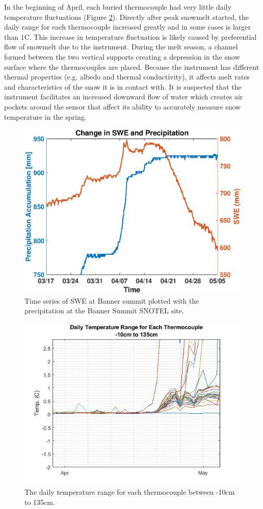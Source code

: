 In the beginning of April, each buried thermocouple had very little daily temperature fluctuations (Figure \ref{fig:DailyTempRange}). Directly after peak snowmelt started, the daily range for each thermocouple increased greatly and in some cases is larger than 1\textdegree C. This increase in temperature fluctuation is likely caused by preferential flow of snowmelt due to the instrument. During the melt season, a channel formed between the two vertical supports creating a depression in the snow surface where the thermocouples are placed. Because the instrument has different thermal properties (e.g. albedo and thermal conductivity), it affects melt rates and characteristics of the snow it is in contact with. It is suspected that the instrument facilitates an increased downward flow of water which creates air pockets around the sensor that affect its ability to accurately measure snow temperature in the spring. 

\begin{figure}[H]
    \centering
    \includegraphics[width=0.7\linewidth]{figures/TCArray/SWE_Precip_LateSeason.eps}
    \caption{Time series of SWE at Banner summit plotted with the precipitation at the Banner Summit SNOTEL site.}
    \label{fig:SWE_SNTLPrecip}
\end{figure}

 \begin{figure}[H]
    \centering
    \includegraphics[width=0.8\linewidth]{figures/DailyTempRange_Isotherm.jpg}
    \caption{The daily temperature range for each thermocouple between -10cm to 135cm.}
    \label{fig:DailyTempRange}
 \end{figure}
 
